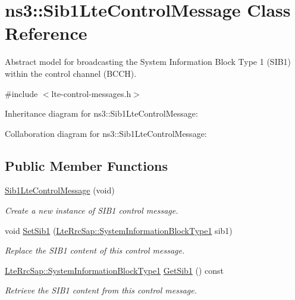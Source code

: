 \hypertarget{classns3_1_1Sib1LteControlMessage}{}\section{ns3\+:\+:Sib1\+Lte\+Control\+Message Class Reference}
\label{classns3_1_1Sib1LteControlMessage}


Abstract model for broadcasting the System Information Block Type 1 (S\+I\+B1) within the control channel (B\+C\+CH).  




{\ttfamily \#include $<$lte-\/control-\/messages.\+h$>$}



Inheritance diagram for ns3\+:\+:Sib1\+Lte\+Control\+Message\+:


Collaboration diagram for ns3\+:\+:Sib1\+Lte\+Control\+Message\+:
\subsection*{Public Member Functions}
\begin{DoxyCompactItemize}
\item 
\hyperlink{classns3_1_1Sib1LteControlMessage_a235acc55df6920a90218c64d0816716a}{Sib1\+Lte\+Control\+Message} (void)
\begin{DoxyCompactList}\small\item\em Create a new instance of S\+I\+B1 control message. \end{DoxyCompactList}\item 
void \hyperlink{classns3_1_1Sib1LteControlMessage_a4e2c68e51f24a331396b2081454905ad}{Set\+Sib1} (\hyperlink{structns3_1_1LteRrcSap_1_1SystemInformationBlockType1}{Lte\+Rrc\+Sap\+::\+System\+Information\+Block\+Type1} sib1)
\begin{DoxyCompactList}\small\item\em Replace the S\+I\+B1 content of this control message. \end{DoxyCompactList}\item 
\hyperlink{structns3_1_1LteRrcSap_1_1SystemInformationBlockType1}{Lte\+Rrc\+Sap\+::\+System\+Information\+Block\+Type1} \hyperlink{classns3_1_1Sib1LteControlMessage_a1f29cc5458842e17b4c96ba49222bf19}{Get\+Sib1} () const 
\begin{DoxyCompactList}\small\item\em Retrieve the S\+I\+B1 content from this control message. \end{DoxyCompactList}\end{DoxyCompactItemize}
